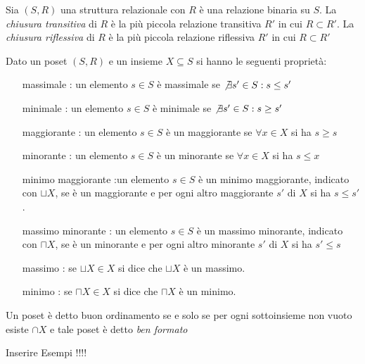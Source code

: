 Sia $(S,R)$ una struttura relazionale con $R$ è una relazione binaria su $S$.
La \emph{chiusura transitiva} di $R$ è la più piccola relazione transitiva $R'$ in cui $R \subset R'$.
La \emph{chiusura riflessiva} di $R$ è la più piccola relazione riflessiva $R'$ in cui $R \subset R'$

\begin{prop}
Dato un poset $(S,R)$ e un insieme $X \subseteq S$ si hanno le seguenti proprietà:
\begin{enumerate}
    \item[massimale]: un elemento $s \in S$ è massimale se $\not \exists s' \in S : s \leq s'$
    \item[minimale]: un elemento $s \in S$ è minimale se $\not \exists s' \in S : s \geq s'$
    \item[maggiorante]: un elemento $s \in S$ è un maggiorante se $\forall x \in X$ si ha $s \geq s$
    \item[minorante]: un elemento $s \in S$ è un minorante se $\forall x \in X$ si ha $s \leq x$
    \item[minimo maggiorante]:un elemento $s \in S$ è un minimo maggiorante, indicato con $\sqcup X$,
          se è un maggiorante e per ogni altro maggiorante $s'$ di $X$ si ha $s \leq s'$.
    \item[massimo minorante]: un elemento $s \in S$ è un massimo minorante, indicato con $\sqcap X$,
          se è un minorante e per ogni altro minorante $s'$ di $X$ si ha $s' \leq s$
    \item[massimo]: se $\sqcup X \in X$ si dice che $\sqcup X$ è un massimo.
    \item[minimo]: se $\sqcap X \in X$ si dice che $\sqcap X$ è un minimo.
\end{enumerate}
\end{prop}

\begin{defi}
    Un poset è detto buon ordinamento se e solo se per ogni sottoinsieme non vuoto esiste
    $\cap X$ e tale poset è detto \emph{ben formato}
\end{defi}

Inserire Esempi !!!!
